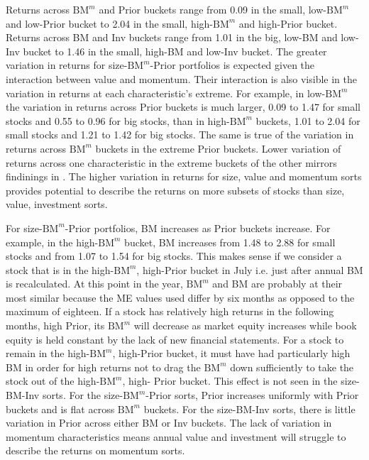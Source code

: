 Returns across $\text{BM}^m$ and Prior buckets range from 0.09 in the small,
low-$\text{BM}^m$ and low-Prior bucket to 2.04 in the small, high-$\text{BM}^m$
and high-Prior bucket. Returns across BM and Inv buckets range from 1.01 in the
big, low-BM and low-Inv bucket to 1.46 in the small, high-BM and low-Inv
bucket. The greater variation in returns for size-$\text{BM}^m$-Prior
portfolios is expected given the interaction between value and momentum. Their
interaction is also visible in the variation in returns at each
characteristic's extreme. For example, in low-$\text{BM}^m$ the variation in
returns across Prior buckets is much larger, 0.09 to 1.47 for small stocks and
0.55 to 0.96 for big stocks, than in high-$\text{BM}^m$ buckets, 1.01 to 2.04
for small stocks and 1.21 to 1.42 for big stocks. The same is true of the
variation in returns across $\text{BM}^m$ buckets in the extreme Prior buckets.
Lower variation of returns across one characteristic in the extreme buckets of
the other mirrors findinings in \textcite{asness2013devil}. The higher
variation in returns for size, value and momentum sorts provides potential to
describe the returns on more subsets of stocks than size, value, investment
sorts.

For size-$\text{BM}^m$-Prior portfolios, BM
increases as Prior buckets increase. For example, in the high-$\text{BM}^m$
bucket, BM increases from 1.48 to 2.88 for small stocks and from 1.07 to 1.54
for big stocks. This makes sense if we consider a stock that is in the
high-$\text{BM}^m$, high-Prior bucket in July i.e. just after annual BM is
recalculated. At this point in the year, $\text{BM}^m$ and BM are probably at
their most similar because the ME values
used differ by six months as opposed to the
maximum of eighteen. If a stock has relatively high returns in the following
months, high Prior, its $\text{BM}^m$ will decrease as market equity increases
while book equity is held constant by the lack of new financial statements. For
a stock to remain in the high-$\text{BM}^m$, high-Prior bucket, it must have
had particularly high BM in order for high returns not to drag the
$\text{BM}^m$ down sufficiently to take the stock out of the
high-$\text{BM}^m$, high- Prior bucket. This effect is not seen in the
size-BM-Inv sorts.
For the size-$\text{BM}^m$-Prior sorts, Prior increases uniformly
with Prior buckets and is flat across $\text{BM}^m$ buckets.
For the size-BM-Inv sorts, there is little variation in Prior across either
BM or Inv buckets.
The lack of variation in momentum characteristics means annual value and
investment will struggle to describe the returns on momentum
sorts.

